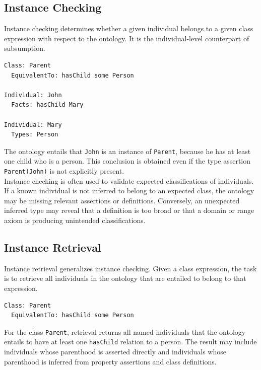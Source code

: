 \documentclass{scrbook}
\begin{document}
	\subsection{Instance Checking}
	
	Instance checking determines whether a given individual belongs to a given class expression with respect to the ontology. It is the individual-level counterpart of subsumption.
	
	\begin{lstlisting}
Class: Parent
  EquivalentTo: hasChild some Person

Individual: John
  Facts: hasChild Mary

Individual: Mary
  Types: Person
	\end{lstlisting}
	
	The ontology entails that \texttt{John} is an instance of \texttt{Parent}, because he has at least one child who is a person. This conclusion is obtained even if the type assertion \texttt{Parent(John)} is not explicitly present.\\
	
	Instance checking is often used to validate expected classifications of individuals. If a known individual is not inferred to belong to an expected class, the ontology may be missing relevant assertions or definitions. Conversely, an unexpected inferred type may reveal that a definition is too broad or that a domain or range axiom is producing unintended classifications.
	
	\subsection{Instance Retrieval}
	
	Instance retrieval generalizes instance checking. Given a class expression, the task is to retrieve all individuals in the ontology that are entailed to belong to that expression.
	
	\begin{lstlisting}
Class: Parent
  EquivalentTo: hasChild some Person
	\end{lstlisting}
	
	For the class \texttt{Parent}, retrieval returns all named individuals that the ontology entails to have at least one \texttt{hasChild} relation to a person. The result may include individuals whose parenthood is asserted directly and individuals whose parenthood is inferred from property assertions and class definitions.\\
	
\end{document}
